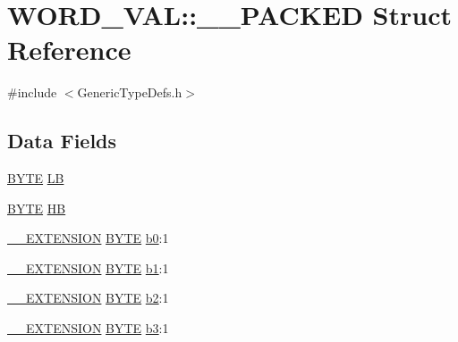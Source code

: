 \hypertarget{struct_w_o_r_d___v_a_l_1_1_____p_a_c_k_e_d}{}\section{W\+O\+R\+D\+\_\+\+V\+A\+L\+:\+:\+\_\+\+\_\+\+P\+A\+C\+K\+E\+D Struct Reference}
\label{struct_w_o_r_d___v_a_l_1_1_____p_a_c_k_e_d}


{\ttfamily \#include $<$Generic\+Type\+Defs.\+h$>$}

\subsection*{Data Fields}
\begin{DoxyCompactItemize}
\item 
\hyperlink{_generic_type_defs_8h_a4ae1dab0fb4b072a66584546209e7d58}{B\+Y\+T\+E} \hyperlink{struct_w_o_r_d___v_a_l_1_1_____p_a_c_k_e_d_a623052b197820c89704b02311fdca816}{L\+B}
\item 
\hyperlink{_generic_type_defs_8h_a4ae1dab0fb4b072a66584546209e7d58}{B\+Y\+T\+E} \hyperlink{struct_w_o_r_d___v_a_l_1_1_____p_a_c_k_e_d_a5a27b50a15cb01af9899b59caa13ec00}{H\+B}
\item 
\hyperlink{_generic_type_defs_8h_a6f634b0fdcc4febac630fc28e2685ddb}{\+\_\+\+\_\+\+E\+X\+T\+E\+N\+S\+I\+O\+N} \hyperlink{_generic_type_defs_8h_a4ae1dab0fb4b072a66584546209e7d58}{B\+Y\+T\+E} \hyperlink{struct_w_o_r_d___v_a_l_1_1_____p_a_c_k_e_d_a4010350907c88306a36c21694097c1ca}{b0}\+:1
\item 
\hyperlink{_generic_type_defs_8h_a6f634b0fdcc4febac630fc28e2685ddb}{\+\_\+\+\_\+\+E\+X\+T\+E\+N\+S\+I\+O\+N} \hyperlink{_generic_type_defs_8h_a4ae1dab0fb4b072a66584546209e7d58}{B\+Y\+T\+E} \hyperlink{struct_w_o_r_d___v_a_l_1_1_____p_a_c_k_e_d_ae2d2abb492a9ddfdbac2ffbc74c649a8}{b1}\+:1
\item 
\hyperlink{_generic_type_defs_8h_a6f634b0fdcc4febac630fc28e2685ddb}{\+\_\+\+\_\+\+E\+X\+T\+E\+N\+S\+I\+O\+N} \hyperlink{_generic_type_defs_8h_a4ae1dab0fb4b072a66584546209e7d58}{B\+Y\+T\+E} \hyperlink{struct_w_o_r_d___v_a_l_1_1_____p_a_c_k_e_d_a5cf608c021221107b5b3f65f890408eb}{b2}\+:1
\item 
\hyperlink{_generic_type_defs_8h_a6f634b0fdcc4febac630fc28e2685ddb}{\+\_\+\+\_\+\+E\+X\+T\+E\+N\+S\+I\+O\+N} \hyperlink{_generic_type_defs_8h_a4ae1dab0fb4b072a66584546209e7d58}{B\+Y\+T\+E} \hyperlink{struct_w_o_r_d___v_a_l_1_1_____p_a_c_k_e_d_acf6dffbe5f9b71653822d63806944784}{b3}\+:1

\end{DoxyCompactItemize}
